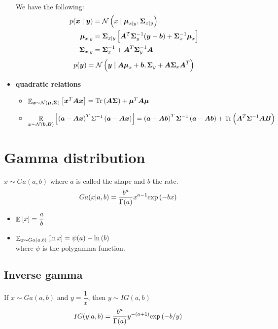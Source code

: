 \documentclass{article}
\begin{document}
\begin{itemize}
\begin{align*}
    \end{align*}
    We have the following:
    \begin{align*}
      p(\vx \given \vy) &= \normal{x \given \vmu_{x \given y}, \vSigma_{x \given y}} \\
      \vmu_{x \given y} &= \vSigma_{x \given y} \sgroup{\vA^T \vSigma_y^{-1} (\vy - \vb) + \vSigma_x^{-1} \vmu_x}\\
      \vSigma_{x \given y} &= \vSigma_x^{-1} + \vA^T \vSigma_y^{-1} \vA
    \end{align*}
    \begin{align*}
      p(\vy) = \normal{\vy \given \vA \vmu_x + \vb,
                       \vSigma_y + \vA \vSigma_x \vA^T}
    \end{align*}
  \item \textbf{quadratic relations}
    \begin{itemize}
      \item $\expected{\vx \sim \normal{\vmu, \vSigma}}{\vx^T \vA \vx}
              = \Tr{\vA \vSigma} + \vmu^T \vA \vmu$
      \item
      $$\expected{\vx \sim \normal{\vb, \vB}}{
        \group{\va - \vA \vx}^T \Sigma^{-1} \group{\va - \vA \vx}}
        = \group{\va - \vA \vb}^T \vSigma^{-1} \group{\va - \vA \vb}
          + \Tr{\vA^T \vSigma^{-1} \vA \vB}$$
    \end{itemize}

\end{itemize}

\section{Gamma distribution}
  $x \sim Ga(a, b)$ where $a$ is called the shape and $b$ the rate.
  \begin{align*}
    Ga(x | a, b) = \dfrac{b^a}{\Gamma(a)} x^{a-1} \func{\exp}{-bx}
  \end{align*}

  \begin{itemize}
    \item $\expected{}{x} = \dfrac{a}{b}$
    \item \( \expected{x \sim Ga(a, b)}{\ln{x}} = \psi(a) - \func{\ln}{b} \) \\
    where $\psi$ is the polygamma function.
  \end{itemize}

\subsection{Inverse gamma}
  If $x \sim Ga(a, b)$ and $y=\dfrac{1}{x}$, then $y \sim IG(a, b)$
  \begin{align*}
    IG(y | a, b) = \dfrac{b^a}{\Gamma(a)} y^{-(a+1)} \func{\exp}{-b/y}
  \end{align*}
\end{document}
